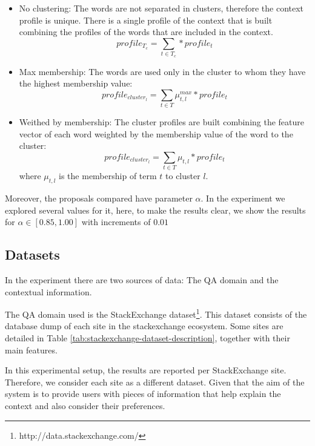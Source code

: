 \documentclass[preprint]{elsarticle}
\begin{document}
\begin{spacing}{2}
\begin{itemize}

	\item No clustering: The words are not separated in clusters, therefore the context profile is unique. There is a single profile of the context that is built combining the profiles of the words that are included in the context.
	\begin{equation}
		profile_{T_c} = \sum_{t \in T_c} * profile_t
	\end{equation}

	\item Max membership: The words are used only in the cluster to whom they have the highest membership value:
	\begin{equation}
		profile_{cluster_l} = \sum_{t \in T} \mu^{max}_{t,l} * profile_t
	\end{equation}

	\item Weithed by membership: The cluster profiles are built combining the feature vector of each word weighted by the membership value of the word to the cluster:
	\begin{equation}
		profile_{cluster_l} = \sum_{t \in T} \mu_{t,l} * profile_t
	\end{equation}
	\noindent where $\mu_{t,l}$ is the membership of term $t$ to cluster $l$.

\end{itemize}

Moreover, the proposals compared have parameter $\alpha$. In the experiment we explored several values for it, here, to make the results clear, we show the results for $\alpha \in [0.85,1.00]$ with increments of $0.01$

\subsection{Datasets}

In the experiment there are two sources of data: The QA domain and the contextual information.

The QA domain used is the StackExchange dataset\footnote{http://data.stackexchange.com/}. This dataset consists of the database dump of each site in the stackexchange ecosystem. Some sites are detailed in Table \ref{tab:stackexchange-dataset-description}, together with their main features.

In this experimental setup, the results are reported per StackExchange site. Therefore, we consider each site as a different dataset. Given that the aim of the system is to provide users with pieces of information that help explain the context and also consider their preferences.


\end{spacing}
\end{document}
